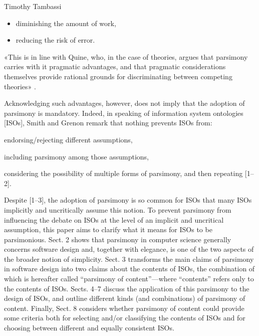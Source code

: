 \begin{artengenv}{Timothy Tambassi}
\begin{itemize}

\item diminishing the amount of work,

\item reducing the risk of error.

\end{itemize}

«This is in line with Quine, who, in the case of theories, argues that parsimony carries with it pragmatic advantages, and that pragmatic considerations themselves provide rational grounds for discriminating between competing theories» 
\parencite[][p.139]{turner_computational_2018}.%




Acknowledging such advantages, however, does not imply that the adoption of parsimony is mandatory. Indeed, in speaking of information system ontologies [ISOs], Smith 
\parencite*[][]{floridi_ontology_2004} %
 and Grenon 
\parencite*[][]{munn_primer_2008} %
 remark that nothing prevents ISOs from:



\begin{enumerate}[label={[\arabic*]}]

\item endorsing/rejecting different assumptions,

\item including parsimony among those assumptions,

\item considering the possibility of multiple forms of parsimony, and then repeating [1–2].

\end{enumerate}

Despite [1–3], the adoption of parsimony is so common for ISOs that many ISOs implicitly and uncritically assume this notion. To prevent parsimony from influencing the debate on ISOs at the level of an implicit and uncritical assumption, this paper aims to clarify what it means for ISOs to be parsimonious. Sect. 2 shows that parsimony in computer science generally concerns software design and, together with elegance, is one of the two aspects of the broader notion of simplicity. Sect. 3 transforms the main claims of parsimony in software design into two claims about the contents of ISOs, the combination of which is hereafter called ``parsimony of content''---where ``contents'' refers only to the contents of ISOs. Sects. 4–7 discuss the application of this parsimony to the design of ISOs, and outline different kinds (and combinations) of parsimony of content. Finally, Sect. 8 considers whether parsimony of content could provide some criteria both for selecting and/or classifying the contents of ISOs and for choosing between different and equally consistent ISOs.




\end{artengenv}
